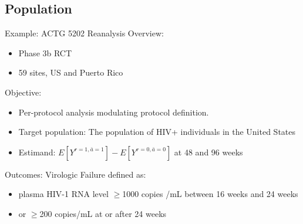 \documentclass{beamer}
\begin{document}
    \subsection{Population}
    \begin{frame}{Example: ACTG 5202 Reanalysis}
        Overview:
            \begin{itemize}
                \item Phase 3b RCT
                \item 59 sites, US and Puerto Rico
            \end{itemize}
            Objective:
        \begin{itemize}
            \item Per-protocol analysis modulating protocol definition.
            \item Target population: The population of HIV+ individuals in the United States
            \item Estimand: $E\left[Y^{r=1,\bar{a}=1}\right]-E\left[Y^{r=0,\bar{a}=0}\right]$ at 48 and 96 weeks
        \end{itemize}
        Outcomes: Virologic Failure defined as:
        \begin{itemize}
         \item plasma HIV-1 RNA level $\geq$1000 copies /mL between 16 weeks and 24 weeks
         \item or $\geq$200 copies/mL at or after 24 weeks
        \end{itemize} 
    \end{frame}
\end{document}
